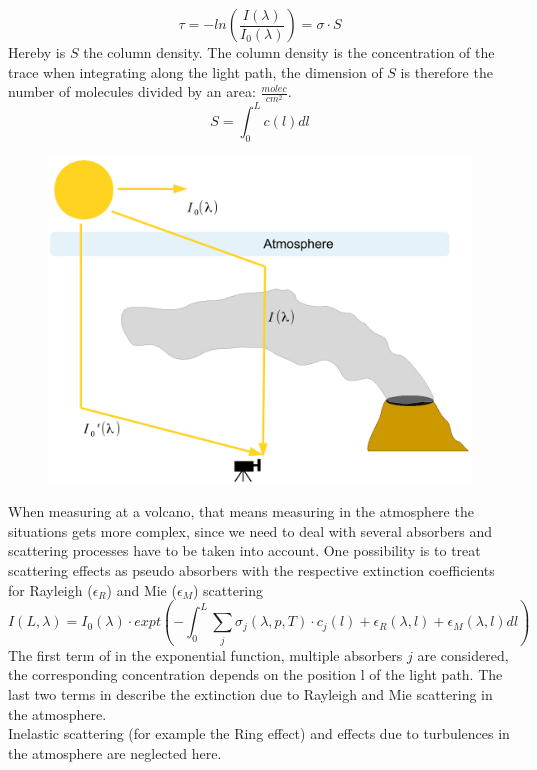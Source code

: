 \documentclass  [
  paper    = a4,
  BCOR     = 10mm,
  twoside,
  fontsize = 12pt,
  fleqn,
  toc      = bibnumbered,
  toc      = listofnumbered,
  numbers  = noendperiod,
  headings = normal,
  listof   = leveldown,
  version  = 3.03
]                                       {scrreprt}
\begin{document}
	\begin{equation}
	\tau = -ln\left(\frac{I\left(\lambda\right)}{I_{0}\left(\lambda\right)}\right) = \sigma\cdot S
	\end{equation}
	Hereby is $S$ the column density. The column density is the concentration of the trace when integrating along the light path, the dimension of $S$ is therefore the number of molecules divided by an area: $\frac{molec}{cm^2}$.
	\begin{equation}
	S = \int_{0}^{L}c\left(l\right)dl
	\end{equation}
	\begin{figure}
		\centering
		\includegraphics[width=0.9\linewidth]{Bilder/DOASFunction}
		\caption{}
		\label{fig:doasfunction}
	\end{figure}
	
	When measuring at a volcano, that means measuring in the atmosphere the situations gets more complex, since we need to deal with several absorbers and scattering processes have to be taken into account. One possibility is to treat scattering effects as pseudo absorbers with the respective extinction coefficients for Rayleigh ($\epsilon_R$) and  Mie ($\epsilon_M$) scattering
	\begin{equation}
	I\left(L,\lambda\right) = I_{0}\left(\lambda\right)\cdot expt\left(-\int^{L}_{0}\sum_{j}\sigma_{j}\left(\lambda,p,T\right)\cdot
	c_{j}\left(l\right)+\epsilon_R\left(\lambda,l\right)+\epsilon_{M}\left(\lambda,l\right)dl\right)
	\label{eq:lbe}
	\end{equation}
	The first term of  in the exponential function, multiple absorbers $j$ are considered, the corresponding concentration depends on the position l of the light path.
	The last two terms in describe the extinction due to Rayleigh and Mie scattering in the atmosphere.\\
	Inelastic scattering (for example the Ring effect) and effects due to turbulences in the atmosphere are neglected here.
\end{document}
